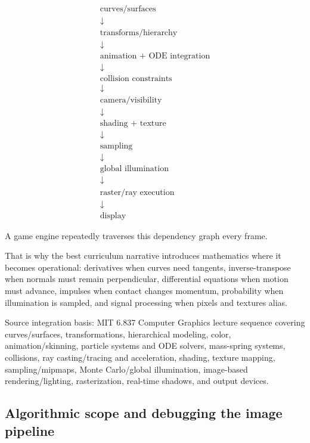 \[
\boxed{
\begin{array}{c}
\text{curves/surfaces}\\
\downarrow\\
\text{transforms/hierarchy}\\
\downarrow\\
\text{animation + ODE integration}\\
\downarrow\\
\text{collision constraints}\\
\downarrow\\
\text{camera/visibility}\\
\downarrow\\
\text{shading + texture}\\
\downarrow\\
\text{sampling}\\
\downarrow\\
\text{global illumination}\\
\downarrow\\
\text{raster/ray execution}\\
\downarrow\\
\text{display}
\end{array}
}
\]

A game engine repeatedly traverses this dependency graph every frame.

That is why the best curriculum narrative introduces mathematics where it becomes operational: derivatives when curves need tangents, inverse-transpose when normals must remain perpendicular, differential equations when motion must advance, impulses when contact changes momentum, probability when illumination is sampled, and signal processing when pixels and textures alias.

Source integration basis: MIT 6.837 Computer Graphics lecture sequence covering curves/surfaces, transformations, hierarchical modeling, color, animation/skinning, particle systems and ODE solvers, mass-spring systems, collisions, ray casting/tracing and acceleration, shading, texture mapping, sampling/mipmaps, Monte Carlo/global illumination, image-based rendering/lighting, rasterization, real-time shadows, and output devices.

\subsection{Algorithmic scope and debugging the image pipeline}\label{03-visual-computing-i-ch001-algorithmic-scope-and-debugging-the-image-pipeline}

